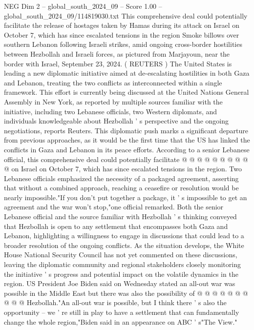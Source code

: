 \begin{textsample}{NEG Dim 2 – global\_south\_2024\_09 – Score 1.00 – global\_south\_2024\_09/114819030.txt}  \label{ex:f2_neg_253}
This comprehensive deal could potentially facilitate the release of hostages taken by Hamas during its attack on Israel on October 7, which has since escalated tensions in the region Smoke billows over southern Lebanon following Israeli strikes, amid ongoing cross-border hostilities between Hezbollah and Israeli forces, as pictured from Marjayoun, near the border with Israel, September 23, 2024. ( REUTERS ) The United States is leading a new diplomatic initiative aimed at de-escalating hostilities in both Gaza and Lebanon, treating the two conflicts as interconnected within a single framework.
This effort is currently being discussed at the United Nations General Assembly in New York, as reported by multiple sources familiar with the initiative, including two Lebanese officials, two Western diplomats, and individuals knowledgeable about Hezbollah ' s perspective and the ongoing negotiations, reports Reuters.
This diplomatic push marks a significant departure from previous approaches, as it would be the first time that the US has linked the conflicts in Gaza and Lebanon in its peace efforts.
According to a senior Lebanese official, this comprehensive deal could potentially facilitate @ @ @ @ @ @ @ @ @ @ on Israel on October 7, which has since escalated tensions in the region.
Two Lebanese officials emphasized the necessity of a packaged agreement, asserting that without a combined approach, reaching a ceasefire or resolution would be nearly impossible."If you don't put together a package, it ' s impossible to get an agreement and the war won't stop,"one official remarked.
Both the senior Lebanese official and the source familiar with Hezbollah ' s thinking conveyed that Hezbollah is open to any settlement that encompasses both Gaza and Lebanon, highlighting a willingness to engage in discussions that could lead to a broader resolution of the ongoing conflicts.
As the situation develops, the White House National Security Council has not yet commented on these discussions, leaving the diplomatic community and regional stakeholders closely monitoring the initiative ' s progress and potential impact on the volatile dynamics in the region.
US President Joe Biden said on Wednesday stated an all-out war was possible in the Middle East but there was also the possibility of @ @ @ @ @ @ @ @ @ @ Hezbollah."An all-out war is possible, but I think there ' s also the opportunity -- we ' re still in play to have a settlement that can fundamentally change the whole region,"Biden said in an appearance on ABC ' s"The View."

\end{textsample}
